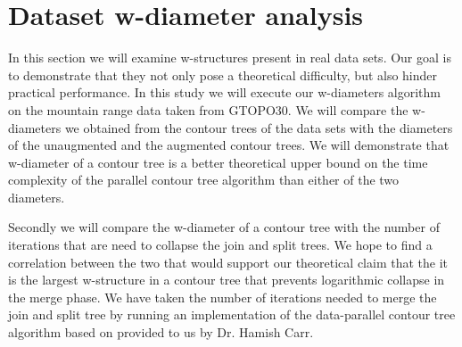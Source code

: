 
%
%


\section {Dataset w-diameter analysis}

In this section we will examine w-structures present in real data sets. Our goal is to demonstrate that they not only pose a theoretical difficulty, but also hinder practical performance. In this study we will execute our w-diameters algorithm on the mountain range data taken from GTOPO30. We will compare the w-diameters we obtained from the contour trees of the data sets with the diameters of the unaugmented and the augmented contour trees. We will demonstrate that w-diameter of a contour tree is a better theoretical upper bound on the time complexity of the parallel contour tree algorithm than either of the two diameters.

Secondly we will compare the w-diameter of a contour tree with the number of iterations that are need to collapse the join and split trees. We hope to find a correlation between the two that would support our theoretical claim that the it is the largest w-structure in a contour tree that prevents logarithmic collapse in the merge phase. We have taken the number of iterations needed to merge the join and split tree by running an implementation of the data-parallel contour tree algorithm based on \cite{parallel-peak-pruning} provided to us by Dr. Hamish Carr.

